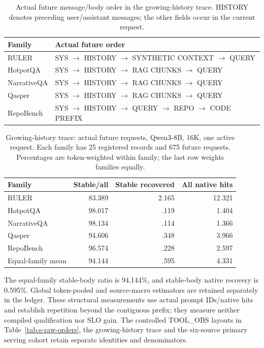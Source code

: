 \begin{table}[t]
\centering\footnotesize
\caption{Actual future message/body order in the growing-history trace. HISTORY denotes preceding user/assistant messages; the other fields occur in the current request.}
\label{tab:s-growing-orders}
\begin{tabular}{@{}lP{2.64in}@{}}
\toprule
Family & Actual future order\\
\midrule
RULER & SYS $\to$ HISTORY $\to$ SYNTHETIC CONTEXT $\to$ QUERY\\
HotpotQA & SYS $\to$ HISTORY $\to$ RAG CHUNKS $\to$ QUERY\\
NarrativeQA & SYS $\to$ HISTORY $\to$ RAG CHUNKS $\to$ QUERY\\
Qasper & SYS $\to$ HISTORY $\to$ RAG CHUNKS $\to$ QUERY\\
RepoBench & SYS $\to$ HISTORY $\to$ QUERY $\to$ REPO $\to$ CODE PREFIX\\
\bottomrule
\end{tabular}
\end{table}

\begin{table}[t]
\centering\footnotesize
\caption{Growing-history trace: actual future requests, Qwen3-8B, 16K, one active request. Each family has 25 registered records and 675 future requests. Percentages are token-weighted within family; the last row weights families equally.}
\label{tab:s-growing-structure}
\begin{tabular}{@{}lrrr@{}}
\toprule
Family & Stable/all & Stable recovered & All native hits\\
\midrule
RULER & 83.389 & 2.165 & 12.321\\
HotpotQA & 98.017 & .119 & 1.404\\
NarrativeQA & 98.134 & .114 & 1.366\\
Qasper & 94.606 & .348 & 3.966\\
RepoBench & 96.574 & .228 & 2.597\\
Equal-family mean & 94.144 & .595 & 4.331\\
\bottomrule
\end{tabular}
\end{table}

The equal-family stable-body ratio is 94.144\%, and stable-body native recovery is 0.595\%. Global token-pooled and source-macro estimators are retained separately in the ledger. These structural measurements use actual prompt IDs/native hits and establish repetition beyond the contiguous prefix; they measure neither compiled qualification nor SLO gain. The controlled TOOL\_OBS layouts in Table~\ref{tab:s-raw-orders}, the growing-history trace and the six-source primary serving cohort retain separate identities and denominators.

